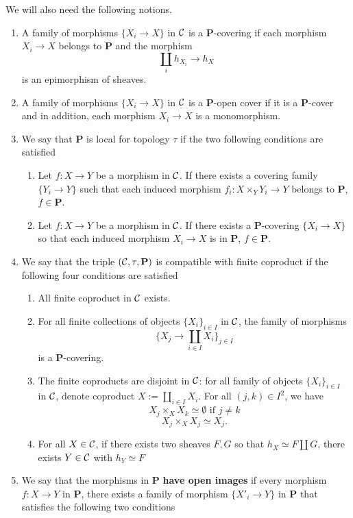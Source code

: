 \documentclass{tufte-book} %
\numberwithin{dummy}{section}
\newcommand{\calc}{{\cal C}}
\newcommand{\lrta}{\longrightarrow}
\newcommand{\bfp}{\mathbf{P}}
\begin{document}
We will also need the following notions.
\begin{enumerate}
\item A family of morphisms $\{X_i\lrta X\}$ in $\calc$ is a $\bfp$-covering if each morphism $X_i\lrta X$ belongs to $\bfp$ and the morphism
$$
\coprod_i h_{X_i}\lrta h_X
$$
is an epimorphism of sheaves.
\item A family of morphisms $\{X_i\lrta X\}$ in $\calc$ is a $\bfp$-open cover if it is a $\bfp$-cover and in addition, each morphism $X_i\lrta X$ is a monomorphism.
\item We say that $\bfp$ is local for topology $\tau$ if the two following conditions are satisfied
\begin{enumerate}[label=(\alph*)]
\item Let $f:X\lrta Y$ be a morphism in $\calc$. If there exists a covering family $\{Y_i\lrta Y\}$ such that each induced morphism $f_i:X\times_Y Y_i\lrta Y$ belongs to $\bfp$, $f\in\bfp$.
\item Let $f:X\lrta Y$ be a morphism in $\calc$. If there exists a $\bfp$-covering $\{X_i\lrta X\}$ so that each induced morphism $X_i\lrta X$ is in $\bfp$,\sidenote{{\color{red}Shouldn't it be $X_i\lrta Y$?}} $f\in \bfp$.
\end{enumerate}
\item We say that the triple $(\calc,\tau,\bfp)$ is compatible with finite coproduct if the following four conditions are satisfied
\begin{enumerate}[label=(\alph*)]
\item All finite coproduct in $\calc$ exists.
\item For all finite collections of objects $\{X_i\}_{i\in I}$ in $\calc$, the family of morphisms
$$
\{X_j\lrta\coprod_{i\in I}X_i\}_{j\in I}
$$
is a $\bfp$-covering.
\item The finite coproducts are disjoint in $\calc$: for all family of objects $\{X_i\}_{i\in I}$ in $\calc$, denote coproduct $X:=\coprod_{i\in I}X_i$. For all $(j,k)\in I^2$, we have
$$
X_j\times_X X_k\simeq \emptyset \text{ if }j\neq k
$$
$$
X_j\times_X X_j\simeq X_j.
$$
\item For all $X\in\calc$, if there exists two sheaves $F,G$ so that $h_X\simeq F\coprod G$, there exists $Y\in \calc$ with $h_Y\simeq F$
\end{enumerate}
\item We say that the morphisms in $\bfp$ \textbf{have open images} if every morphism $f:X\lrta Y$ in $\bfp$, there exists a family of morphism $\{X'_i\lrta Y\}$ in $\bfp$ that satisfies the following two conditions

\end{enumerate}
\end{document}

